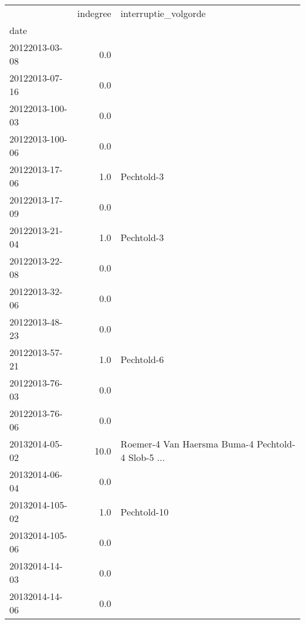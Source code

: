 \begin{tabular}{lrl}
\toprule
{} &  indegree &                               interruptie\_volgorde \\
date            &           &                                                    \\
\midrule
20122013-03-08  &       0.0 &                                                    \\
20122013-07-16  &       0.0 &                                                    \\
20122013-100-03 &       0.0 &                                                    \\
20122013-100-06 &       0.0 &                                                    \\
20122013-17-06  &       1.0 &                                         Pechtold-3 \\
20122013-17-09  &       0.0 &                                                    \\
20122013-21-04  &       1.0 &                                         Pechtold-3 \\
20122013-22-08  &       0.0 &                                                    \\
20122013-32-06  &       0.0 &                                                    \\
20122013-48-23  &       0.0 &                                                    \\
20122013-57-21  &       1.0 &                                         Pechtold-6 \\
20122013-76-03  &       0.0 &                                                    \\
20122013-76-06  &       0.0 &                                                    \\
20132014-05-02  &      10.0 &  Roemer-4 Van Haersma Buma-4 Pechtold-4 Slob-5 ... \\
20132014-06-04  &       0.0 &                                                    \\
20132014-105-02 &       1.0 &                                        Pechtold-10 \\
20132014-105-06 &       0.0 &                                                    \\
20132014-14-03  &       0.0 &                                                    \\
20132014-14-06  &       0.0 &                                                    \\

\end{tabular}
